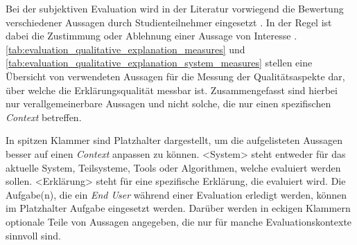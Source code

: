 \bigskip

Bei der subjektiven Evaluation wird in der Literatur vorwiegend die Bewertung verschiedener Aussagen durch Studienteilnehmer eingesetzt \cite{sato_action-triggering_2019, sato_context_nodate, wang_is_2018}. In der Regel ist dabei die Zustimmung oder Ablehnung einer Aussage von Interesse \cite{hoffman_metrics_nodate, koo_understanding_2016, koo_why_2015, hernandez-bocanegra_effects_2020}. \autoref{tab:evaluation_qualitative_explanation_measures} und \autoref{tab:evaluation_qualitative_explanation_system_measures} stellen eine Übersicht von verwendeten Aussagen für die Messung der Qualitätsaspekte dar, über welche die Erklärungsqualität messbar ist. Zusammengefasst sind hierbei nur verallgemeinerbare Aussagen und nicht solche, die nur einen spezifischen \textit{Context} betreffen.

In spitzen Klammer sind Platzhalter dargestellt, um die aufgelisteten Aussagen besser auf einen \textit{Context} anpassen zu können. \glqq <System>\grqq{} steht entweder für das aktuelle System, Teilsysteme, Tools oder Algorithmen, welche evaluiert werden sollen. \glqq <Erklärung>\grqq{} steht für eine spezifische Erklärung, die evaluiert wird. Die Aufgabe(n), die ein \textit{End User} während einer Evaluation erledigt werden, können im Platzhalter \glqq Aufgabe\grqq{} eingesetzt werden. Darüber werden in eckigen Klammern optionale Teile von Aussagen angegeben, die nur für manche Evaluationskontexte sinnvoll sind.

